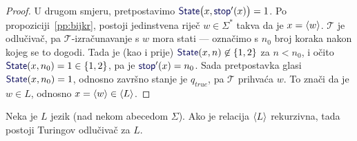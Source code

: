 \begin{proof}
U drugom smjeru, pretpostavimo $\f{State}\bigl(x,\f{stop}'(x)\bigr)=1$. Po propoziciji~\ref{pp:bijkr}, postoji jedinstvena riječ $w\in\Sigma^*$ takva da je $x=\langle w\rangle$. $\mathcal T$ je odlučivač, pa $\mathcal T$-izračunavanje s $w$ mora stati --- označimo s $n_0$ broj koraka nakon kojeg se to dogodi. Tada je (kao i prije) $\f{State}(x,n)\not\in\{1,2\}$ za $n<n_0$, i očito $\f{State}(x,n_0)=1\in\{1,2\}$, pa je $\f{stop}'(x)=n_0$. Sada pretpostavka glasi $\f{State}(x,n_0)=1$, odnosno završno stanje je $q_{\mathit{true}}$, pa $\mathcal T$ prihvaća $w$. To znači da je $w\in L$, odnosno $x=\langle w\rangle\in\langle L\rangle$.
\end{proof}
\newpage

\begin{teorem}\label{tm:krio}
Neka je $L$ jezik (nad nekom abecedom $\Sigma$). Ako je relacija $\langle L\rangle$ rekurzivna, tada postoji Turingov odlučivač za $L$.
\end{teorem}
